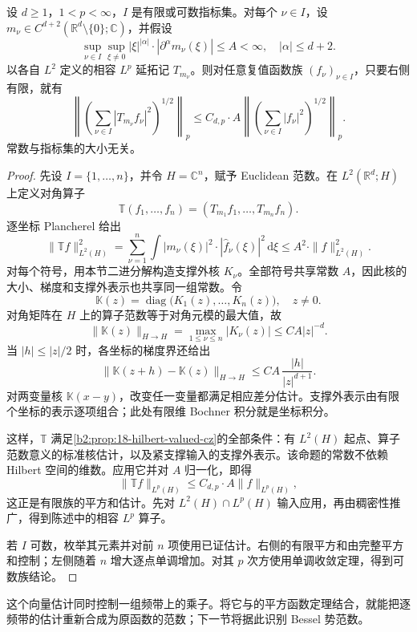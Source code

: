 \begin{proposition}\label{b2:prop:22-uniform-mihlin-square}
设 \(d\geq1\)，\(1<p<\infty\)，\(I\) 是有限或可数指标集。对每个 \(\nu\in I\)，设 \(m_\nu\in C^{d+2}(\mathbb R^d\setminus\{0\};\mathbb C)\)，并假设
\[
 \sup_{\nu\in I}\sup_{\xi\ne0}
 |\xi|^{|\alpha|}\cdot|\partial^\alpha m_\nu(\xi)|
 \leq A<\infty,\quad|\alpha|\leq d+2.
\]
以各自 \(L^2\) 定义的相容 \(L^p\) 延拓记 \(T_{m_\nu}\)。则对任意复值函数族 \((f_\nu)_{\nu\in I}\)，只要右侧有限，就有
\[
 \left\|\left(\sum_{\nu\in I}|T_{m_\nu}f_\nu|^2\right)^{1/2}\right\|_p
 \leq C_{d,p}\cdot A
 \left\|\left(\sum_{\nu\in I}|f_\nu|^2\right)^{1/2}\right\|_p.
\]
常数与指标集的大小无关。
\end{proposition}
\begin{proof}
先设 \(I=\{1,\ldots,n\}\)，并令 \(H=\mathbb C^n\)，赋予 Euclidean 范数。在 \(L^2(\mathbb R^d;H)\) 上定义对角算子
\[
 \mathbb T(f_1,\ldots,f_n)
 =(T_{m_1}f_1,\ldots,T_{m_n}f_n).
\]
逐坐标 Plancherel 给出
\[
 \|\mathbb Tf\|_{L^2(H)}^2
 =\sum_{\nu=1}^{n}\int|m_\nu(\xi)|^2
 \cdot|\widehat f_\nu(\xi)|^2\,\mathrm d\xi
 \leq A^2\cdot\|f\|_{L^2(H)}^2.
\]
对每个符号，用本节二进分解构造支撑外核 \(K_\nu\)。全部符号共享常数 \(A\)，因此核的大小、梯度和支撑外表示也共享同一组常数。令
\[
 \mathbb K(z)=\operatorname{diag}
 \bigl(K_1(z),\ldots,K_n(z)\bigr),\quad z\ne0.
\]
对角矩阵在 \(H\) 上的算子范数等于对角元模的最大值，故
\[
 \|\mathbb K(z)\|_{H\to H}
 =\max_{1\leq\nu\leq n}|K_\nu(z)|
 \leq C A|z|^{-d}.
\]
当 \(|h|\leq|z|/2\) 时，各坐标的梯度界还给出
\[
 \|\mathbb K(z+h)-\mathbb K(z)\|_{H\to H}
 \leq C A\,\frac{|h|}{|z|^{d+1}}.
\]
对两变量核 \(\mathbb K(x-y)\)，改变任一变量都满足相应差分估计。支撑外表示由有限个坐标的表示逐项组合；此处有限维 Bochner 积分就是坐标积分。

这样，\(\mathbb T\) 满足\cref{b2:prop:18-hilbert-valued-cz}的全部条件：有 \(L^2(H)\) 起点、算子范数意义的标准核估计，以及紧支撑输入的支撑外表示。该命题的常数不依赖 Hilbert 空间的维数。应用它并对 \(A\) 归一化，即得
\[
 \|\mathbb Tf\|_{L^p(H)}
 \leq C_{d,p}\cdot A\|f\|_{L^p(H)},
\]
这正是有限族的平方和估计。先对 \(L^2(H)\cap L^p(H)\) 输入应用，再由稠密性推广，得到陈述中的相容 \(L^p\) 算子。

若 \(I\) 可数，枚举其元素并对前 \(n\) 项使用已证估计。右侧的有限平方和由完整平方和控制；左侧随着 \(n\) 增大逐点单调增加。对其 \(p\) 次方使用单调收敛定理，得到可数族结论。
\end{proof}

这个向量估计同时控制一组频带上的乘子。将它与的平方函数定理结合，就能把逐频带的估计重新合成为原函数的范数；下一节将据此识别 Bessel 势范数。
